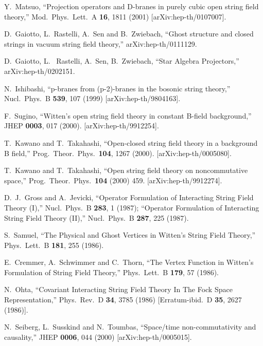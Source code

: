 \documentclass[a4paper,12pt]{article}
\begin{document}
\begin{thebibliography}{999}
Y.~Matsuo,
``Projection operators and D-branes 
in purely cubic open string field  theory,''
Mod.\ Phys.\ Lett.\ A {\bf 16}, 1811 (2001)
[arXiv:hep-th/0107007].

D.~Gaiotto, L.~Rastelli, A.~Sen and B.~Zwiebach,
``Ghost structure and closed strings in vacuum string field theory,''
arXiv:hep-th/0111129.

D.~Gaiotto, L.~ Rastelli, A.~Sen, B.~Zwiebach,
``Star Algebra Projectors,''
arXiv:hep-th/0202151.

N.~Ishibashi,
``p-branes from (p-2)-branes in the bosonic string theory,''
Nucl.\ Phys.\ B {\bf 539}, 107 (1999)
[arXiv:hep-th/9804163].

F.~Sugino,
``Witten's open string field theory 
in constant B-field background,''
JHEP {\bf 0003}, 017 (2000).
[arXiv:hep-th/9912254].

T.~Kawano and T.~Takahashi,
``Open-closed string field theory in a background B field,''
Prog.\ Theor.\ Phys.\  {\bf 104}, 1267 (2000).
[arXiv:hep-th/0005080].

T.~Kawano and T.~Takahashi,
``Open string field theory on noncommutative space,''
Prog.\ Theor.\ Phys.\  {\bf 104} (2000) 459.
[arXiv:hep-th/9912274].



D.~J.~Gross and A.~Jevicki,
``Operator Formulation of Interacting String Field Theory (I),''
Nucl.\ Phys.\ B {\bf 283}, 1 (1987);
``Operator Formulation of Interacting String Field Theory (II),''
Nucl.\ Phys.\ B {\bf 287}, 225 (1987).



S.~Samuel,
``The Physical and Ghost Vertices in Witten's String Field Theory,''
Phys.\ Lett.\ B {\bf 181}, 255 (1986).


E.~Cremmer, A.~Schwimmer and C.~Thorn,
``The Vertex Function in Witten's Formulation of String Field Theory,''
Phys.\ Lett.\ B {\bf 179}, 57 (1986).


N.~Ohta,
``Covariant Interacting String Field Theory 
In The Fock Space Representation,''
Phys.\ Rev.\ D {\bf 34}, 3785 (1986)
[Erratum-ibid.\ D {\bf 35}, 2627 (1986)].

N.~Seiberg, L.~Susskind and N.~Toumbas,
``Space/time non-commutativity and causality,''
JHEP {\bf 0006}, 044 (2000)
[arXiv:hep-th/0005015].


\end{thebibliography}
\end{document}
